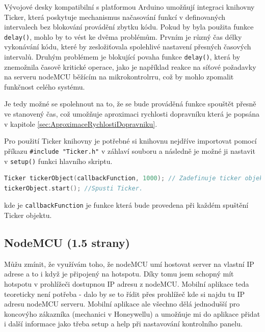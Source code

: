 Vývojové desky kompatibilní s platformou Arduino umožňují integraci knihovny Ticker, která poskytuje mechanismus načasování funkcí v definovaných intervalech bez blokování provádění zbytku kódu. Pokud by byla použita funkce \texttt{delay()}, mohlo by to vést ke dvěma problémům. Prvním je různý čas délky vykonávání kódu, které by zesložiťovala spolehlivé nastavení přesných časových intervalů. Druhým problémem je blokující povaha funkce \texttt{delay()}, která by znemožnila časově kritické operace, jako je například reakce na síťové požadavky na serveru nodeMCU běžícím na mikrokontrolrru, což by mohlo zpomalit funkčnost celého systému. \cite{TickerKnihovna}

Je tedy možné se spolehnout na to, že se bude prováděná funkce spouštět přesně ve stanovený čas, což umožňuje aproximaci rychlosti dopravníku která je popsána v kapitole \ref{sec:AproximaceRychlostiDopravniku}.

Pro použití Ticker knihovny je potřebné si knihovnu nejdříve importovat pomocí příkazu \texttt{\#include "Ticker.h"} v záhlaví souboru a následně je možné ji nastavit v \texttt{setup()} funkci hlavního skriptu.

\begin{lstlisting}[language=C++, caption={Použití ticker knihovny uvnitř \texttt{setup()} funkce \cite{TickerGitHubPage}}, label={lst:TickerUkazka}]
Ticker tickerObject(callbackFunction, 1000); // Zadefinuje ticker objekt
tickerObject.start(); //Spusti Ticker.
\end{lstlisting}
kde je \texttt{callbackFunction} je funkce která bude provedena při každém spuštění Ticker objektu.

\subsection{NodeMCU (1.5 strany)}

Můžu zmínit, že využívám toho, že nodeMCU umí hostovat server na vlastní IP adrese a to i když je připojený na hotspotu. Díky tomu jsem schopný mít hotspotu v prohlížeči dostupnou IP adresu z nodeMCU. Mobilní aplikace teda teoreticky není potřeba - dalo by se to řídit přes prohlížeč kde si najdu tu IP adresu nodeMCU serveru. Mobilní aplikace ale všechno dělá jednodušší pro koncovýho zákazníka (mechanici v Honeywellu) a umožňuje mi do aplikace přidat i další informace jako třeba setup a help při nastavování kontrolního panelu.

